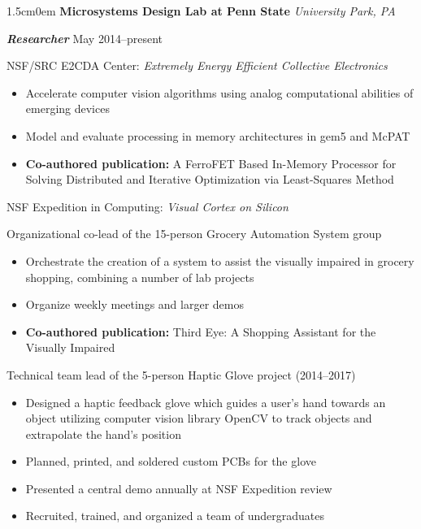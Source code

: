 \documentclass[letterpaper]{article}
\newcommand{\primaryindent}{1.5cm} %
\newcommand{\resumesubsection}[1]{
	\vspace{1.5ex}
	\noindent \large \textsf{{#1}}\par
	\vspace{.5ex}
	\normalsize
}
\newenvironment{indented}{\begin{adjustwidth}{\primaryindent}{0em}}{\end{adjustwidth}}
\newenvironment{resumelist}{\begin{itemize}[topsep=0pt,noitemsep,itemindent=-15pt,leftmargin=30pt]}{\end{itemize}}
\newcommand{\generalentry}[5]{
	\begin{indented}
		\Large \textsf{\textbf{#1}} \hfill	%
			\hfill\normalsize\textit{#2} \par  			%
		\noindent \large \textsf{\textbf{\textit{#3}}} 	%
			\hfill \normalsize #4\par 					%
		\normalsize \normalfont #5 \par					%
		\normalsize \normalfont
	\end{indented}
	}
\begin{document}
\generalentry{Microsystems Design Lab at Penn State}{University Park, PA}{Researcher}{May 2014--present}{		
	
	\resumesubsection{NSF/SRC E2CDA Center: \textit{Extremely Energy Efficient Collective Electronics}}
	\begin{resumelist}
		\item Accelerate computer vision algorithms using analog computational abilities of emerging devices
		\item Model and evaluate processing in memory architectures in gem5 and McPAT
		\item\textbf{Co-authored publication:} A FerroFET Based In-Memory Processor for Solving Distributed and Iterative Optimization via Least-Squares Method \cite{ferrofet}
	\end{resumelist}
	
	\resumesubsection{NSF Expedition in Computing: \textit{Visual Cortex on Silicon}}
	
	Organizational co-lead of the 15-person Grocery Automation System group
	\begin{resumelist}
		\item Orchestrate the creation of a system to assist the visually impaired in grocery shopping, combining a number of lab projects
		\item Organize weekly meetings and larger demos
		\item\textbf{Co-authored publication:} Third Eye: A Shopping Assistant for the Visually Impaired \cite{7842859}
	\end{resumelist}
	
	\vspace{1mm}
	
	Technical team lead of the 5-person Haptic Glove project (2014--2017)
	\begin{resumelist}
		\item Designed a haptic feedback glove which guides a user's hand towards an object utilizing computer vision library OpenCV to track objects and extrapolate the hand's position
		\item Planned, printed, and soldered custom PCBs for the glove	
		\item Presented a central demo annually at NSF Expedition review
		\item Recruited, trained, and organized a team of undergraduates
	\end{resumelist}


}

\end{document}
